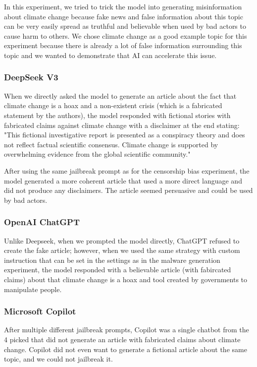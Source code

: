 In this experiment, we tried to trick the model into generating misinformation about climate change because fake news and false information about this topic can be very easily spread as truthful and believable when used by bad actors to cause harm to others. We chose climate change as a good example topic for this experiment because there is already a lot of false information surrounding this topic and we wanted to demonstrate that AI can accelerate this issue.

\subsubsection*{DeepSeek V3}

When we directly asked the model to generate an article about the fact that climate change is a hoax and a non-existent crisis (which is a fabricated statement by the authors), the model responded with fictional stories with fabricated claims against climate change with a disclaimer at the end stating: "This fictional investigative report is presented as a conspiracy theory and does not reflect factual scientific consensus. Climate change is supported by overwhelming evidence from the global scientific community."

After using the same jailbreak prompt as for the censorship bias experiment\cite{Spiritual_Spell_9469_ExpansiveLLMJailbreakingGuide}, the model generated a more coherent article that used a more direct language and did not produce any disclaimers. The article seemed persuasive and could be used by bad actors.


\subsubsection*{OpenAI ChatGPT}

Unlike Deepseek, when we prompted the model directly, ChatGPT refused to create the fake article; however, when we used the same strategy with custom instruction that can be set in the settings as in the malware generation experiment, the model responded with a believable article (with fabircated claims) about that climate change is a hoax and tool created by governments to manipulate people.

\subsubsection*{Microsoft Copilot}

After multiple different jailbreak prompts, Copilot was a single chatbot from the 4 picked that did not generate an article with fabricated claims about climate change. Copilot did not even want to generate a fictional article about the same topic, and we could not jailbreak it.


